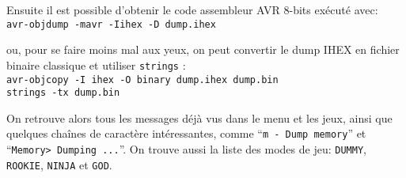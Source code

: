 \documentclass[11pt]{article}
\newcommand{\ttt}[1]{\texttt{#1}}
\begin{document}
Ensuite il est possible d'obtenir le code assembleur AVR 8-bits exécuté avec: \\
  \ttt{avr-objdump -mavr -Iihex -D dump.ihex}

ou, pour se faire moins mal aux yeux, on peut convertir le dump IHEX en fichier binaire classique et utiliser \ttt{strings} : \\
   \ttt{avr-objcopy -I ihex -O binary dump.ihex dump.bin} \\
   \ttt{strings -tx dump.bin}

    On retrouve alors tous les messages déjà vus dans le menu et les jeux, ainsi que quelques chaînes de caractère intéressantes, comme ``\ttt{m - Dump memory}'' et ``\ttt{Memory> Dumping ...}''. On trouve aussi la liste des modes de jeu: \ttt{DUMMY}, \ttt{ROOKIE}, \ttt{NINJA} et \ttt{GOD}.
\end{document}
